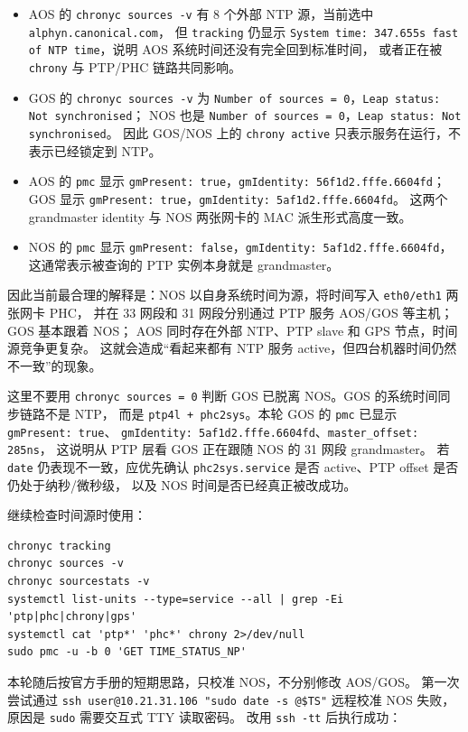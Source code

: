 \documentclass[UTF8,11pt,a4paper]{ctexart}
\begin{document}
\begin{itemize}
  \item AOS 的 \texttt{chronyc sources -v} 有 8 个外部 NTP 源，当前选中 \texttt{alphyn.canonical.com}，
  但 \texttt{tracking} 仍显示 \texttt{System time: 347.655s fast of NTP time}，说明 AOS 系统时间还没有完全回到标准时间，
  或者正在被 \texttt{chrony} 与 PTP/PHC 链路共同影响。
  \item GOS 的 \texttt{chronyc sources -v} 为 \texttt{Number of sources = 0}，\texttt{Leap status: Not synchronised}；
  NOS 也是 \texttt{Number of sources = 0}，\texttt{Leap status: Not synchronised}。
  因此 GOS/NOS 上的 \texttt{chrony active} 只表示服务在运行，不表示已经锁定到 NTP。
  \item AOS 的 \texttt{pmc} 显示 \texttt{gmPresent: true}，\texttt{gmIdentity: 56f1d2.fffe.6604fd}；
  GOS 显示 \texttt{gmPresent: true}，\texttt{gmIdentity: 5af1d2.fffe.6604fd}。
  这两个 grandmaster identity 与 NOS 两张网卡的 MAC 派生形式高度一致。
  \item NOS 的 \texttt{pmc} 显示 \texttt{gmPresent: false}，\texttt{gmIdentity: 5af1d2.fffe.6604fd}，
  这通常表示被查询的 PTP 实例本身就是 grandmaster。
\end{itemize}

因此当前最合理的解释是：NOS 以自身系统时间为源，将时间写入 \texttt{eth0/eth1} 两张网卡 PHC，
并在 33 网段和 31 网段分别通过 PTP 服务 AOS/GOS 等主机；GOS 基本跟着 NOS；
AOS 同时存在外部 NTP、PTP slave 和 GPS 节点，时间源竞争更复杂。
这就会造成“看起来都有 NTP 服务 active，但四台机器时间仍然不一致”的现象。

这里不要用 \texttt{chronyc sources = 0} 判断 GOS 已脱离 NOS。GOS 的系统时间同步链路不是 NTP，
而是 \texttt{ptp4l + phc2sys}。本轮 GOS 的 \texttt{pmc} 已显示 \texttt{gmPresent: true}、
\texttt{gmIdentity: 5af1d2.fffe.6604fd}、\texttt{master\_offset: 285ns}，
这说明从 PTP 层看 GOS 正在跟随 NOS 的 31 网段 grandmaster。
若 \texttt{date} 仍表现不一致，应优先确认 \texttt{phc2sys.service} 是否 active、PTP offset 是否仍处于纳秒/微秒级，
以及 NOS 时间是否已经真正被改成功。

继续检查时间源时使用：

\begin{verbatim}
chronyc tracking
chronyc sources -v
chronyc sourcestats -v
systemctl list-units --type=service --all | grep -Ei 'ptp|phc|chrony|gps'
systemctl cat 'ptp*' 'phc*' chrony 2>/dev/null
sudo pmc -u -b 0 'GET TIME_STATUS_NP'
\end{verbatim}

本轮随后按官方手册的短期思路，只校准 NOS，不分别修改 AOS/GOS。
第一次尝试通过 \texttt{ssh user@10.21.31.106 "sudo date -s @\$TS"} 远程校准 NOS 失败，
原因是 \texttt{sudo} 需要交互式 TTY 读取密码。
改用 \texttt{ssh -tt} 后执行成功：
\end{document}
